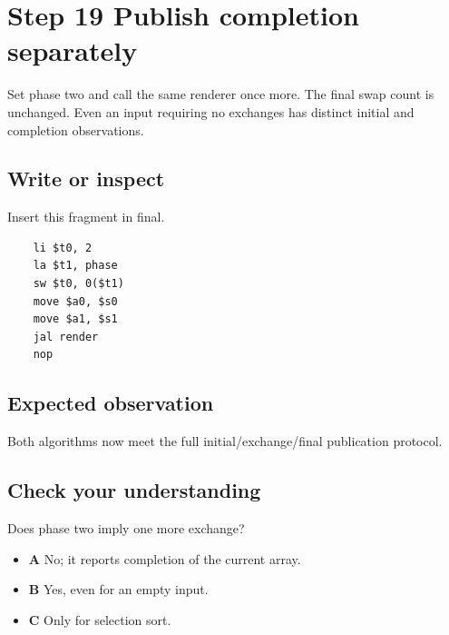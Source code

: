 \section{Step 19 Publish completion
  separately}\label{009-sorting-visualizer-s19-step-19-publish-completion-separately}

Set phase two and call the same renderer once more. The final swap count
is unchanged. Even an input requiring no exchanges has distinct initial
and completion observations.

\subsection{Write or
  inspect}\label{009-sorting-visualizer-s19-write-or-inspect}

Insert this fragment in final.

\begin{verbatim}
    li $t0, 2
    la $t1, phase
    sw $t0, 0($t1)
    move $a0, $s0
    move $a1, $s1
    jal render
    nop
\end{verbatim}

\subsection{Expected
  observation}\label{009-sorting-visualizer-s19-expected-observation}

Both algorithms now meet the full initial/exchange/final publication
protocol.

\subsection{Check your
  understanding}\label{009-sorting-visualizer-s19-check-your-understanding}

Does phase two imply one more exchange?

\begin{itemize}
  \tightlist
  \item
        \textbf{A} No; it reports completion of the current array.
  \item
        \textbf{B} Yes, even for an empty input.
  \item
        \textbf{C} Only for selection sort.
\end{itemize}
